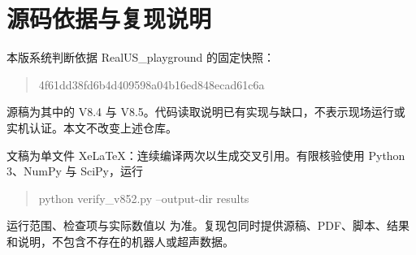 \documentclass[11pt,a4paper,fontset=fandol]{ctexart}
\theoremstyle{definition}\newtheorem{definition}[theorem]{定义}
\theoremstyle{remark}\newtheorem{remark}[theorem]{说明}
\numberwithin{equation}{section}
\begin{document}
\section{源码依据与复现说明}
本版系统判断依据 RealUS\_playground 的固定快照：
\begin{quote}\small\ttfamily
4f61dd38fd6b4d409598a04b16ed848ecad61c6a
\end{quote}
源稿为其中的 V8.4 与 V8.5\cite{v84,v85}。代码读取说明已有实现与缺口，不表示现场运行或实机认证。本文不改变上述仓库。

文稿为单文件 XeLaTeX：连续编译两次以生成交叉引用。有限核验使用 Python 3、NumPy 与 SciPy，运行
\begin{quote}\small\ttfamily
python verify\_v852.py --output-dir results
\end{quote}
运行范围、检查项与实际数值以  为准。复现包同时提供源稿、PDF、脚本、结果和说明，不包含不存在的机器人或超声数据。
\end{document}
